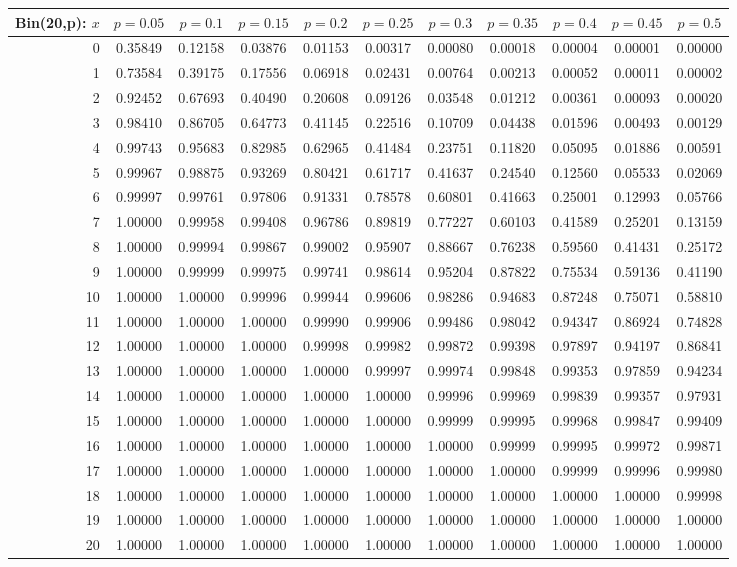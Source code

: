 \documentclass{article}
\begin{document}
{\vspace{8pt minus 6pt}
\begin{tabular}{@{\extracolsep{-2pt}}|r|c|c|c|c|c|c|c|c|c|c|}
\hline
Bin(20,p): $x$
   & $p\!=\!0.05$& $p\!=\!0.1$& $p\!=\!0.15$& $p\!=\!0.2$& $p\!=\!0.25$& $p\!=\!0.3$& $p\!=\!0.35$& $p\!=\!0.4$& $p\!=\!0.45$& $p\!=\!0.5$\\\hline
  0&0.35849&0.12158&0.03876&0.01153&0.00317&0.00080&0.00018&0.00004&0.00001&0.00000\\
  1&0.73584&0.39175&0.17556&0.06918&0.02431&0.00764&0.00213&0.00052&0.00011&0.00002\\
  2&0.92452&0.67693&0.40490&0.20608&0.09126&0.03548&0.01212&0.00361&0.00093&0.00020\\
  3&0.98410&0.86705&0.64773&0.41145&0.22516&0.10709&0.04438&0.01596&0.00493&0.00129\\
  4&0.99743&0.95683&0.82985&0.62965&0.41484&0.23751&0.11820&0.05095&0.01886&0.00591\\
  5&0.99967&0.98875&0.93269&0.80421&0.61717&0.41637&0.24540&0.12560&0.05533&0.02069\\
  6&0.99997&0.99761&0.97806&0.91331&0.78578&0.60801&0.41663&0.25001&0.12993&0.05766\\
  7&1.00000&0.99958&0.99408&0.96786&0.89819&0.77227&0.60103&0.41589&0.25201&0.13159\\
  8&1.00000&0.99994&0.99867&0.99002&0.95907&0.88667&0.76238&0.59560&0.41431&0.25172\\
  9&1.00000&0.99999&0.99975&0.99741&0.98614&0.95204&0.87822&0.75534&0.59136&0.41190\\
 10&1.00000&1.00000&0.99996&0.99944&0.99606&0.98286&0.94683&0.87248&0.75071&0.58810\\
 11&1.00000&1.00000&1.00000&0.99990&0.99906&0.99486&0.98042&0.94347&0.86924&0.74828\\
 12&1.00000&1.00000&1.00000&0.99998&0.99982&0.99872&0.99398&0.97897&0.94197&0.86841\\
 13&1.00000&1.00000&1.00000&1.00000&0.99997&0.99974&0.99848&0.99353&0.97859&0.94234\\
 14&1.00000&1.00000&1.00000&1.00000&1.00000&0.99996&0.99969&0.99839&0.99357&0.97931\\
 15&1.00000&1.00000&1.00000&1.00000&1.00000&0.99999&0.99995&0.99968&0.99847&0.99409\\
 16&1.00000&1.00000&1.00000&1.00000&1.00000&1.00000&0.99999&0.99995&0.99972&0.99871\\
 17&1.00000&1.00000&1.00000&1.00000&1.00000&1.00000&1.00000&0.99999&0.99996&0.99980\\
 18&1.00000&1.00000&1.00000&1.00000&1.00000&1.00000&1.00000&1.00000&1.00000&0.99998\\
 19&1.00000&1.00000&1.00000&1.00000&1.00000&1.00000&1.00000&1.00000&1.00000&1.00000\\
 20&1.00000&1.00000&1.00000&1.00000&1.00000&1.00000&1.00000&1.00000&1.00000&1.00000\\
\hline
\end{tabular}

}
\end{document}
